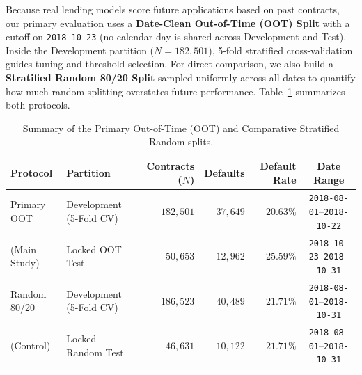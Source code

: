 Because real lending models score future applications based on past contracts, our primary evaluation uses a \textbf{Date-Clean Out-of-Time (OOT) Split} with a cutoff on \texttt{2018-10-23} (no calendar day is shared across Development and Test). Inside the Development partition ($N = 182{,}501$), 5-fold stratified cross-validation guides tuning and threshold selection. For direct comparison, we also build a \textbf{Stratified Random 80/20 Split} sampled uniformly across all dates to quantify how much random splitting overstates future performance. Table~\ref{tab:splits} summarizes both protocols.

\begin{table}[htbp]
  \centering
  \caption{Summary of the Primary Out-of-Time (OOT) and Comparative Stratified Random splits.}
  \label{tab:splits}
  \footnotesize
  \setlength{\tabcolsep}{3.5pt}
  \begin{tabular}{@{}llrrrc@{}}
    \toprule
    \textbf{Protocol} & \textbf{Partition} & \textbf{Contracts ($N$)} & \textbf{Defaults} & \textbf{Default Rate} & \textbf{Date Range} \\
    \midrule
    Primary OOT & Development (5-Fold CV) & $182{,}501$ & $37{,}649$ & $20.63\%$ & \texttt{2018-08-01}--\texttt{2018-10-22} \\
    (Main Study) & Locked OOT Test & $50{,}653$ & $12{,}962$ & $25.59\%$ & \texttt{2018-10-23}--\texttt{2018-10-31} \\
    \midrule
    Random 80/20 & Development (5-Fold CV) & $186{,}523$ & $40{,}489$ & $21.71\%$ & \texttt{2018-08-01}--\texttt{2018-10-31} \\
    (Control) & Locked Random Test & $46{,}631$ & $10{,}122$ & $21.71\%$ & \texttt{2018-08-01}--\texttt{2018-10-31} \\
    \bottomrule
  \end{tabular}
\end{table}

